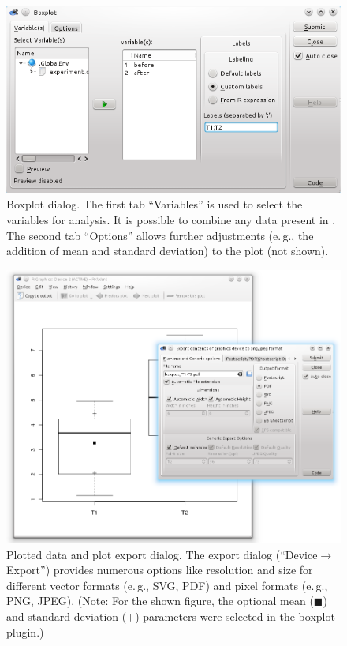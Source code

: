\begin{figure}[b!]
 \centering
 \includegraphics[width=15.5cm]{../figures/boxplot1.png}
 \caption{Boxplot dialog. The first tab ``Variables'' is used to select the variables for analysis. It is possible to
  combine any data present in . The second tab ``Options'' allows further adjustments (e.\,g., the addition of mean and standard deviation) to the plot (not shown).}
 \label{fig:boxplot1}
\end{figure}

\begin{figure}[b!]
 \centering
 \includegraphics[width=15.5cm]{../figures/boxplot2.png}
 \caption{Plotted data and plot export dialog. The export dialog (``Device$\rightarrow$Export'') provides numerous 
  options like resolution and size for different vector formats (e.\,g., SVG, PDF) and 
  pixel formats (e.\,g., PNG, JPEG). (Note: For the shown figure, the optional  
  mean ($\blacksquare$) and standard deviation ($+$) parameters were selected in the boxplot plugin.)}
 \label{fig:boxplot2}
\end{figure}
